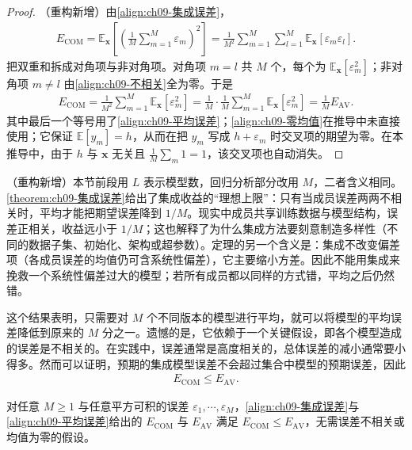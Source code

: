 \documentclass[../../main.tex]{subfiles}
\begin{document}
\begin{proof}
（重构新增）由\eqref{align:ch09-集成误差}，
\begin{align*}
E_{\mathrm{COM}}=\mathbb{E}_{\boldsymbol{x}}\!\left[\left(\frac{1}{M}\sum_{m=1}^{M}\varepsilon_{m}\right)^{2}\right]=\frac{1}{M^{2}}\sum_{m=1}^{M}\sum_{l=1}^{M}\mathbb{E}_{\boldsymbol{x}}[\varepsilon_{m}\varepsilon_{l}].
\end{align*}
把双重和拆成对角项与非对角项。对角项 $m=l$ 共 $M$ 个，每个为 $\mathbb{E}_{\boldsymbol{x}}[\varepsilon_{m}^{2}]$；非对角项 $m\neq l$ 由\eqref{align:ch09-不相关}全为零。于是
\begin{align*}
E_{\mathrm{COM}}=\frac{1}{M^{2}}\sum_{m=1}^{M}\mathbb{E}_{\boldsymbol{x}}[\varepsilon_{m}^{2}]=\frac{1}{M}\cdot\frac{1}{M}\sum_{m=1}^{M}\mathbb{E}_{\boldsymbol{x}}[\varepsilon_{m}^{2}]=\frac{1}{M}E_{\mathrm{AV}}.
\end{align*}
其中最后一个等号用了\eqref{align:ch09-平均误差}；\eqref{align:ch09-零均值}在推导中未直接使用；它保证 $\mathbb{E}[y_{m}]=h$，从而在把 $y_{m}$ 写成 $h+\varepsilon_{m}$ 时交叉项的期望为零。在本推导中，由于 $h$ 与 $\boldsymbol{x}$ 无关且 $\frac{1}{M}\sum_{m}1=1$，该交叉项也自动消失。
\end{proof}

\begin{remark}（重构新增）本节前段用 $L$ 表示模型数，回归分析部分改用 $M$，二者含义相同。\cref{theorem:ch09-集成误差}给出了集成收益的“理想上限”：只有当成员误差两两不相关时，平均才能把期望误差降到 $1/M$。现实中成员共享训练数据与模型结构，误差正相关，收益远小于 $1/M$；这也解释了为什么集成方法要刻意制造多样性（不同的数据子集、初始化、架构或超参数）。定理的另一个含义是：集成不改变偏差项（各成员误差的均值仍可含系统性偏差），它主要缩小方差。因此不能用集成来挽救一个系统性偏差过大的模型；若所有成员都以同样的方式错，平均之后仍然错。
\end{remark}

这个结果表明，只需要对 $M$ 个不同版本的模型进行平均，就可以将模型的平均误差降低到原来的 $M$ 分之一。遗憾的是，它依赖于一个关键假设，即各个模型造成的误差是不相关的。在实践中，误差通常是高度相关的，总体误差的减小通常要小得多。然而可以证明，预期的集成模型误差不会超过集合中模型的预期误差，因此
\begin{align*}
E_{\mathrm{COM}}\leqslant E_{\mathrm{AV}}.
\end{align*}

\begin{proposition}\label{proposition:ch09-集成上界}
对任意 $M\geqslant1$ 与任意平方可积的误差 $\varepsilon_{1},\cdots,\varepsilon_{M}$，\eqref{align:ch09-集成误差}与\eqref{align:ch09-平均误差}给出的 $E_{\mathrm{COM}}$ 与 $E_{\mathrm{AV}}$ 满足 $E_{\mathrm{COM}}\leqslant E_{\mathrm{AV}}$，无需误差不相关或均值为零的假设。
\end{proposition}
\end{document}
